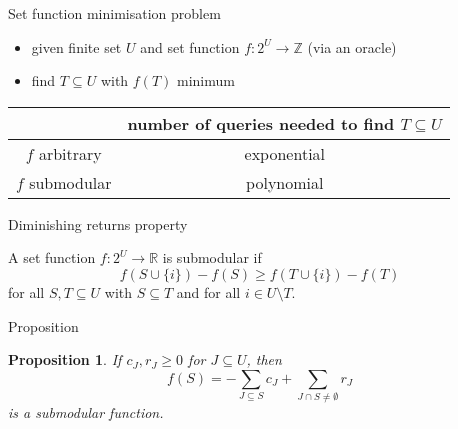 \documentclass[usenames,dvipsnames]{beamer}
\newcommand{\R}{\mathbb{R}}
\newcommand{\Z}{\mathbb{Z}}
\newtheorem{prop}{Proposition}
\begin{document}
\begin{frame}{Set function minimisation problem}
  \begin{itemize}
    \item given finite set $U$ and set function $f: 2^U \rightarrow
      \Z$ (via an oracle)
    \item find $T \subseteq U$ with $f(T)$ minimum
  \end{itemize}
  \begin{tabular}{ c|c } 
    & number of queries needed to find $T \subseteq U$\\
    \hline
    $f$ arbitrary & exponential\\
    $f$ submodular & polynomial\\ 
  \end{tabular}
\end{frame}

\begin{frame}{Diminishing returns property}
  \begin{definition}
    A set function $f : 2^U \rightarrow \R$ is submodular if \[f(S
    \cup \{i\}) - f(S) \geq f(T \cup \{i\}) - f(T) \] for all $S,T
    \subseteq U$ with $S \subseteq T$ and for all $i \in U \setminus
    T$.
  \end{definition}
\end{frame}

\begin{frame}{Proposition}
  \begin{prop}\label{prop}
    If $c_J, r_J \geq 0$ for $J \subseteq U$,
    then \begin{equation}f(S) = -\sum\limits_{J \subseteq S} c_J +
      \sum\limits_{J \cap S \neq \emptyset}
      r_J\label{prop}\end{equation} is a submodular function.
  \end{prop}
\end{frame}
\end{document}
